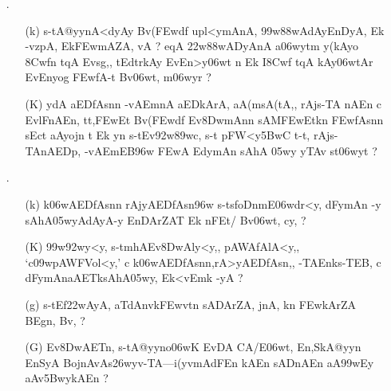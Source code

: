 \begin{itemize}                 
  \item[{\dn \dnnum \rn{31}}.] \begin{itemize}
                 
                 \item[({\dn k})] {\dn s\2-tA@yynA<dyAy Bv(\3FEwd\?f\? upl<ymAnA, \399w\388wAdAyEnDyA, Ek\2\- -vzpA, Ek\2\3FEwmAZA, vA {\rs ?\re} eqA\2 \322w\388wADyAnA a\306wytm\?{\rs ,\re} y(kAyo{\qvb} \38Cw\?f\?n t\?qA\2 Evsg\0,{\rs ,\re} tEdtrkAy\?{\qvb} EvEn>y\306wt\? n Ek I\38Cwf\2 t\?qA\2 kAy\0\306wtAr\? EvEnyog\2 \3FEwfA-t\2 Bv\306wt, m\306wy\?r {\rs ?\re}}
                 
                 \item[({\dn K})] {\dn ydA aEDfAsn\?n -vAEmnA aEDkArA, aA(m\-sA(tA,{\rs ,\re} rAjs\2-TA\- nAEn c EvlFnAEn{\rs ,\re} tt,\3FEwEt Bv(\3FEwd\?f\? Ev\38DwmAn\?n sAM\3FEwEtk\?n \3FEwfAsn\?n sEct aAyojn\2 t\2 Ek y\?n s\2-tEv\392w\389wc, s\2-t\- pFW\?<y\35BwC t\4-t\4, rAjs\2-TAnAEDp\4, -vAEmEB\396w \3FEwA EdymAn\2 sAhA\- \305wy\2 yTAv\0 s\2t\306wy\?t {\rs ?\re}}
  
                \end{itemize} 
                
\item[{\dn \dnnum \rn{32}}.] \begin{itemize}
               
               \item[({\dn k})] {\dn k\?\306wAEDfAsn\?n rAjyAEDfAsn\4\396w s\2-ts\2foDn\-mE\306wdr\?<y, dFymAn\- -y sAhA\305wyAdAyA-y EnDA\0rZAT\0 Ek\2 nFEt/\2 Bv\306wt, cy\?, {\rs ?\re}}  
                
               \item[({\dn K})] {\dn \399w\392w\?y\?<y, s\2-tmhAEv\38DwAly\?<y,{\rs ,\re} pAWAfAlA<y,{\rs ,\re} {\rs `\re}c\309wpAWFVol\?<y,{\rs '\re} c k\?\306wAEDfAsn\?n{\rs ,\re}\break rA>yAEDfAsn\4,{\rs ,\re} -TAEnks\2-TEB, c dFymAn\break aAET\0ksAhA\305wy, Ek\2<vEmk\2 -yA {\rs ?\re} } 
               
               \item[({\dn g})] {\dn s\2-tEf\322wAyA, aT\0dAnv\0k\3FEwvt\0n\? sADArZA, jnA, k\?n \3FEwkAr\?ZA BEgn, Bv\?, {\rs ?\re}}
               
               \item[({\dn G})] {\dn Ev\38DwAET\0n, s\2-tA@yyno\306wK EvDA\2 CA/E\306wt{\rs ,\re} En,SkA@yyn En\0SyA BojnAvAs\326wyv-TA{\rs ---\re}i(y\?vmAdFEn kAEn sADnAEn aA\399wEy\-  aAv\35BwykAEn {\rs ?\re}}
               

\end{itemize}
\end{itemize}
